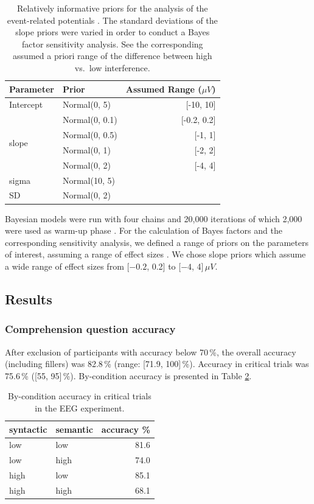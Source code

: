 \documentclass[review,preprint,12pt,authoryear,floatsintext]{elsarticle}
\begin{document}
\begin{table}[!htbp]
    \caption{Relatively informative priors for the analysis of the event-related potentials \citep{nicenboim_stats}. The standard deviations of the slope priors were varied in order to conduct a Bayes factor sensitivity analysis. See the corresponding assumed a priori range of the difference between high vs.\ low interference.}
    \label{tab:eeg_priors}
    \centering
    \begin{tabular}{llr}
    \toprule
    Parameter&Prior &Assumed Range ($\mu V$)\\
    \midrule
  Intercept & Normal(0, 5)& [-10, 10]\\
  \cmidrule{2-3}
  \multirow{4}{1cm}{slope} & Normal(0, 0.1) & [-0.2, 0.2]\\
  & Normal(0, 0.5)& [-1, 1]\\
  & Normal(0, 1) & [-2, 2]\\
  & Normal(0, 2) & [-4, 4]\\
  \cmidrule{2-3}
  sigma & Normal(10, 5)&\\
  SD & Normal(0, 2)&\\
    \bottomrule
    \end{tabular}
\end{table}

Bayesian models were run with four chains and 20,000 iterations of which 2,000 were used as warm-up phase \citep{schad_etal_2022_BF}. For the calculation of Bayes factors and the corresponding sensitivity analysis, we defined a range of priors on the parameters of interest, assuming a range of effect sizes \citep{nicenboim_stats,schad_etal_2022_BF}. We chose slope priors which assume a wide range of effect sizes from [$-0.2$, 0.2] to [$-4$, 4]\,$\mu V$. 

\subsection*{Results}
\subsubsection*{Comprehension question accuracy}
After exclusion of participants with accuracy below 70\,\%, the overall accuracy (including fillers) was 82.8\,\% (range: [71.9, 100]\,\%). Accuracy in critical trials was 75.6\,\% ([55, 95]\,\%). By-condition accuracy is presented in Table \ref{tab:eeg_acc}. 

\begin{table}[ht]
    \caption{By-condition accuracy in critical trials in the EEG experiment.}
    \label{tab:eeg_acc}
    \centering
    \begin{tabular}{llr}
    \toprule
    syntactic & semantic & accuracy \%\\
    \midrule
        low &  low & 81.6\\
        low &  high & 74.0\\
        high &  low & 85.1\\
        high &  high & 68.1\\
    \bottomrule
    \end{tabular}
\end{table}
\end{document}
